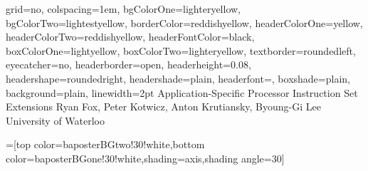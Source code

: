 \documentclass[landscape,final]{baposter}
\begin{document}
\begin{poster}{
  grid=no,
  colspacing=1em,
  bgColorOne=lighteryellow,
  bgColorTwo=lightestyellow,
  borderColor=reddishyellow,
  headerColorOne=yellow,
  headerColorTwo=reddishyellow,
  headerFontColor=black,
  boxColorOne=lightyellow,
  boxColorTwo=lighteryellow,
  textborder=roundedleft,
  eyecatcher=no,
  headerborder=open,
  headerheight=0.08\textheight,
  headershape=roundedright,
  headershade=plain,
  headerfont=\Large\textsf, %
  boxshade=plain,
  background=plain,
  linewidth=2pt
  }
  {} %
  {\sf %
    Application-Specific Processor Instruction Set Extensions
  }
  {\sf %
    Ryan Fox, Peter Kotwicz, Anton Krutiansky, Byoung-Gi Lee %
    \hspace{3em}
    University of Waterloo
  }
  {{\begin{minipage}{16em}
    \hfill
  \end{minipage}}
  }

  =[top color=baposterBGtwo!30!white,bottom color=baposterBGone!30!white,shading=axis,shading angle=30]

     \newlength{\leftimgwidth}
     \setlength{\leftimgwidth}{0.78em+8.0em}

    \newcommand{\colouredcircle}[1]{%
      \tikz{\useasboundingbox (-0.2em,-0.32em) rectangle(0.2em,0.32em); \draw[draw=black,fill=baposterBGone!80!black!#1!white,line width=0.03em] (0,0) circle(0.18em);}}


\end{poster}
\end{document}
